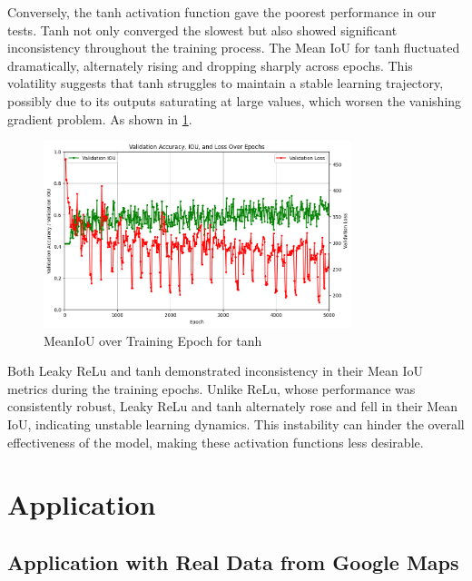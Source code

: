 \documentclass[conference]{IEEEtran}
\begin{document}
Conversely, the tanh activation function gave the poorest performance in our tests. Tanh not only converged the slowest but also showed significant inconsistency throughout the training process. The Mean IoU for tanh fluctuated dramatically, alternately rising and dropping sharply across epochs. This volatility suggests that tanh struggles to maintain a stable learning trajectory, possibly due to its outputs saturating at large values, which worsen the vanishing gradient problem. As shown in \ref{fig:perf_tanh}.
\begin{figure}[htbp]
    \centering
    \includegraphics[width=0.8\textwidth]{tanh_perf.png} %
    \caption{MeanIoU over Training Epoch for tanh}
    \label{fig:perf_tanh}
\end{figure}

Both Leaky ReLu and tanh demonstrated inconsistency in their Mean IoU metrics during the training epochs. Unlike ReLu, whose performance was consistently robust, Leaky ReLu and tanh alternately rose and fell in their Mean IoU, indicating unstable learning dynamics. This instability can hinder the overall effectiveness of the model, making these activation functions less desirable.





\section{Application}
\subsection{Application with Real Data from Google Maps}
\end{document}
